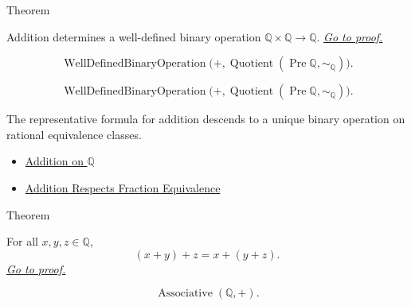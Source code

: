 \begin{theorembox}{Theorem}
\begin{theorem}
\label{thm:addition-on-q-well-defined}
Addition determines a well-defined binary operation
$\mathbb{Q}\times\mathbb{Q}\to\mathbb{Q}$.
\hyperref[prf:addition-on-q-well-defined]{\textit{Go to proof.}}
\end{theorem}
\end{theorembox}

\begin{remark*}
\[
\operatorname{WellDefinedBinaryOperation}
\bigl(+,\operatorname{Quotient}(\operatorname{Pre}\mathbb{Q},\sim_{\mathbb{Q}})\bigr).
\]
\end{remark*}

\begin{remark*}
\[
\operatorname{WellDefinedBinaryOperation}
\bigl(+,\operatorname{Quotient}(\operatorname{Pre}\mathbb{Q},\sim_{\mathbb{Q}})\bigr).
\]
\end{remark*}

\begin{remark*}[Interpretation]
The representative formula for addition descends to a unique binary operation
on rational equivalence classes.
\end{remark*}

\begin{dependencies}
\begin{itemize}
  \item \hyperref[def:addition-on-q-classes]{Addition on $\mathbb{Q}$}
  \item \hyperref[lem:addition-on-q-respects-equivalence]{Addition Respects Fraction Equivalence}
\end{itemize}
\end{dependencies}

\begin{theorembox}{Theorem}
\begin{theorem}
\label{thm:addition-on-q-associative}
For all $x,y,z\in\mathbb{Q}$,
\[
(x+y)+z=x+(y+z).
\]
\hyperref[prf:addition-on-q-associative]{\textit{Go to proof.}}
\end{theorem}
\end{theorembox}

\begin{remark*}
\[
\operatorname{Associative}(\mathbb{Q},+).
\]
\end{remark*}

